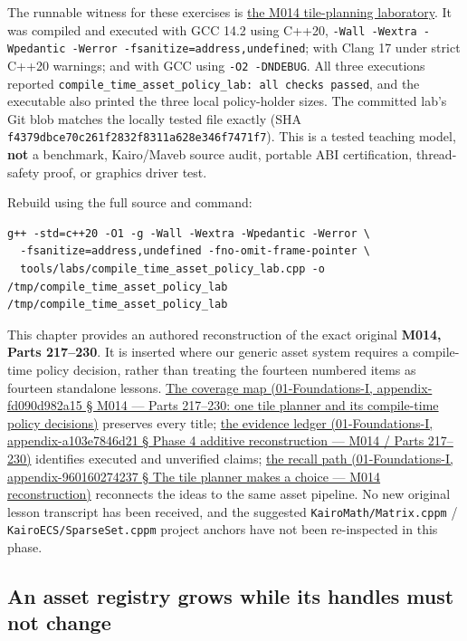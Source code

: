 The runnable witness for these exercises is \href{tools/labs/compile_time_asset_policy_lab.cpp}{the M014 tile-planning laboratory}. It was compiled and executed with GCC 14.2 using C++20, \texttt{-Wall\ -Wextra\ -Wpedantic\ -Werror\ -fsanitize=address,undefined}; with Clang 17 under strict C++20 warnings; and with GCC using \texttt{-O2\ -DNDEBUG}. All three executions reported \texttt{compile\_time\_asset\_policy\_lab:\ all\ checks\ passed}, and the executable also printed the three local policy-holder sizes. The committed lab's Git blob matches the locally tested file exactly (SHA \texttt{f4379dbce70c261f2832f8311a628e346f7471f7}). This is a tested teaching model, \textbf{not} a benchmark, Kairo/Maveb source audit, portable ABI certification, thread-safety proof, or graphics driver test.

Rebuild using the full source and command:

\begin{verbatim}
g++ -std=c++20 -O1 -g -Wall -Wextra -Wpedantic -Werror \
  -fsanitize=address,undefined -fno-omit-frame-pointer \
  tools/labs/compile_time_asset_policy_lab.cpp -o /tmp/compile_time_asset_policy_lab
/tmp/compile_time_asset_policy_lab
\end{verbatim}

This chapter provides an authored reconstruction of the exact original \textbf{M014, Parts 217--230}. It is inserted where our generic asset system requires a compile-time policy decision, rather than treating the fourteen numbered items as fourteen standalone lessons. \href{}{The coverage map (01-Foundations-I, appendix-fd090d982a15 § M014 --- Parts 217--230: one tile planner and its compile-time policy decisions)} preserves every title; \href{}{the evidence ledger (01-Foundations-I, appendix-a103e7846d21 § Phase 4 additive reconstruction --- M014 / Parts 217--230)} identifies executed and unverified claims; \href{}{the recall path (01-Foundations-I, appendix-960160274237 § The tile planner makes a choice --- M014 reconstruction)} reconnects the ideas to the same asset pipeline. No new original lesson transcript has been received, and the suggested \texttt{KairoMath/Matrix.cppm} / \texttt{KairoECS/SparseSet.cppm} project anchors have not been re-inspected in this phase.

\subsection{An asset registry grows while its handles must not change}\label{an-asset-registry-grows-while-its-handles-must-not-change}

